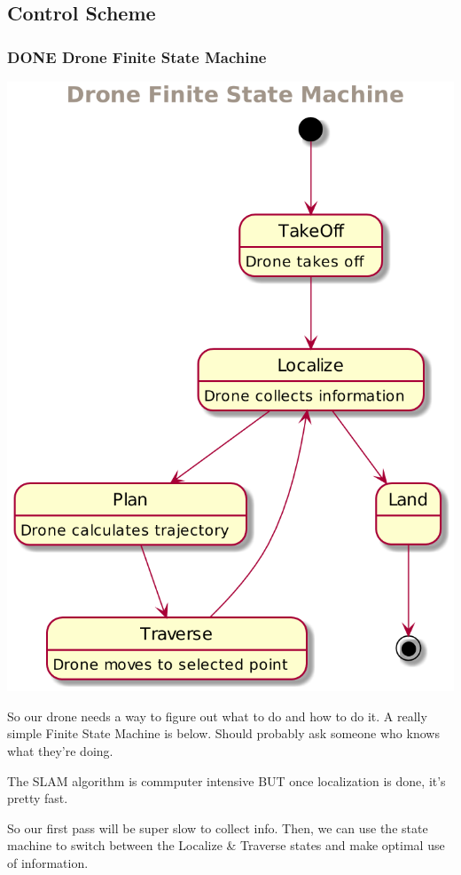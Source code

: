 \documentclass[unrestricted]{meetingnotesminutes}
\begin{document}
\subsection{Control Scheme}
\label{sec:org3b4bc7a}
\subsubsection{{\bfseries\sffamily DONE} Drone Finite State Machine}
\label{sec:orgb8e25df}
\begin{center}
\includegraphics[width=.9\linewidth]{drone-fsm.png}
\end{center}



So our drone needs a way to figure out what to do and how to do it.
A really simple Finite State Machine is below. Should probably ask someone who knows what they're doing.

The SLAM algorithm is commputer intensive BUT once localization is done, it's pretty fast.

So our first pass will be super slow to collect info.
Then, we can use the state machine to switch between the Localize \& Traverse states and make optimal use of information.
\end{document}
